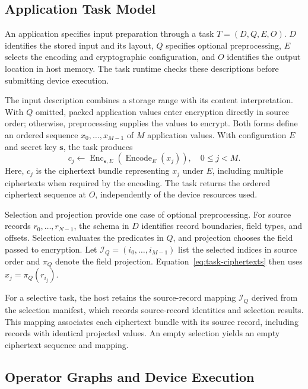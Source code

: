 \documentclass[sigconf,anonymous,balance=false]{acmart}
\newcommand{\bodypar}{\par\vskip 0pt plus 6pt\relax}
\begin{document}
\subsection{Application Task Model}
\label{subsec:application-task}

An application specifies input preparation through a task $T=(D,Q,E,O)$. $D$ identifies the stored input and its layout, $Q$ specifies optional preprocessing, $E$ selects the encoding and cryptographic configuration, and $O$ identifies the output location in host memory. The task runtime checks these descriptions before submitting device execution.
\bodypar

The input description combines a storage range with its content interpretation. With $Q$ omitted, packed application values enter encryption directly in source order; otherwise, preprocessing supplies the values to encrypt. Both forms define an ordered sequence $x_0,\ldots,x_{M-1}$ of $M$ application values. With configuration $E$ and secret key $\mathbf{s}$, the task produces
\begin{equation}
  c_j \leftarrow \operatorname{Enc}_{\mathbf{s},E}\!\left(
    \operatorname{Encode}_{E}\!\left(x_j\right)
  \right),\quad 0\leq j<M.
  \label{eq:task-ciphertexts}
\end{equation}
Here, $c_j$ is the ciphertext bundle representing $x_j$ under $E$, including multiple ciphertexts when required by the encoding. The task returns the ordered ciphertext sequence at $O$, independently of the device resources used.
\bodypar

Selection and projection provide one case of optional preprocessing. For source records $r_0,\ldots,r_{N-1}$, the schema in $D$ identifies record boundaries, field types, and offsets. Selection evaluates the predicates in $Q$, and projection chooses the field passed to encryption. Let $\mathcal{I}_Q=(i_0,\ldots,i_{M-1})$ list the selected indices in source order and $\pi_Q$ denote the field projection. Equation~\eqref{eq:task-ciphertexts} then uses $x_j=\pi_Q(r_{i_j})$.

For a selective task, the host retains the source-record mapping $\mathcal{I}_Q$ derived from the selection manifest, which records source-record identities and selection results. This mapping associates each ciphertext bundle with its source record, including records with identical projected values. An empty selection yields an empty ciphertext sequence and mapping.

\subsection{Operator Graphs and Device Execution}
\label{subsec:operator-execution}
\end{document}
